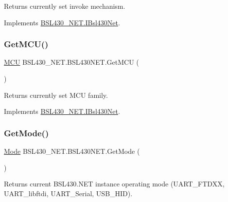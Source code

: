Returns currently set invoke mechanism. 



Implements \mbox{\hyperlink{interface_b_s_l430___n_e_t_1_1_i_bsl430_net_a2b6319eca4ebe15b214212e719c4ddb5}{B\+S\+L430\+\_\+\+N\+E\+T.\+I\+Bsl430\+Net}}.

\mbox{\label{class_b_s_l430___n_e_t_1_1_b_s_l430_n_e_t_ac9bd1e8e4adc0355b5562a24717cfa35}} 
\subsubsection{\texorpdfstring{GetMCU()}{GetMCU()}}
{\footnotesize\ttfamily \mbox{\hyperlink{namespace_b_s_l430___n_e_t_a2cdaa65be7e1679fc8ca77610b19a490}{M\+CU}} B\+S\+L430\+\_\+\+N\+E\+T.\+B\+S\+L430\+N\+E\+T.\+Get\+M\+CU (\begin{DoxyParamCaption}{ }\end{DoxyParamCaption})}



Returns currently set M\+CU family. 



Implements \mbox{\hyperlink{interface_b_s_l430___n_e_t_1_1_i_bsl430_net_ad9efb6c8632e8bd971f34d58ccdeea4b}{B\+S\+L430\+\_\+\+N\+E\+T.\+I\+Bsl430\+Net}}.

\mbox{\label{class_b_s_l430___n_e_t_1_1_b_s_l430_n_e_t_af98024781d260383a8b869a6338cbeb9}} 
\subsubsection{\texorpdfstring{GetMode()}{GetMode()}}
{\footnotesize\ttfamily \mbox{\hyperlink{namespace_b_s_l430___n_e_t_aa1c6981cb6f279b5491d861ca555a1d7}{Mode}} B\+S\+L430\+\_\+\+N\+E\+T.\+B\+S\+L430\+N\+E\+T.\+Get\+Mode (\begin{DoxyParamCaption}{ }\end{DoxyParamCaption})}



Returns current B\+S\+L430.\+N\+ET instance operating mode (U\+A\+R\+T\+\_\+\+F\+T\+D\+XX, U\+A\+R\+T\+\_\+libftdi, U\+A\+R\+T\+\_\+\+Serial, U\+S\+B\+\_\+\+H\+ID). 



